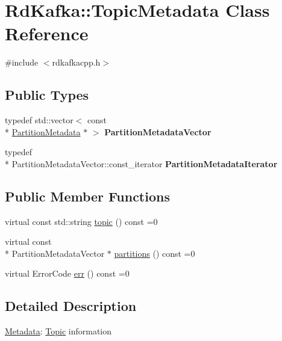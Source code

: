 \hypertarget{classRdKafka_1_1TopicMetadata}{\section{Rd\-Kafka\-:\-:Topic\-Metadata Class Reference}
\label{classRdKafka_1_1TopicMetadata}
}


{\ttfamily \#include $<$rdkafkacpp.\-h$>$}

\subsection*{Public Types}
\begin{DoxyCompactItemize}
\item 
\hypertarget{classRdKafka_1_1TopicMetadata_a79cef242d0f8c8630e7afac0ba3dfb55}{typedef std\-::vector$<$ const \\*
\hyperlink{classRdKafka_1_1PartitionMetadata}{Partition\-Metadata} $\ast$ $>$ {\bfseries Partition\-Metadata\-Vector}}\label{classRdKafka_1_1TopicMetadata_a79cef242d0f8c8630e7afac0ba3dfb55}

\item 
\hypertarget{classRdKafka_1_1TopicMetadata_aeef93f964b3c3dcde1067752be9f6508}{typedef \\*
Partition\-Metadata\-Vector\-::const\-\_\-iterator {\bfseries Partition\-Metadata\-Iterator}}\label{classRdKafka_1_1TopicMetadata_aeef93f964b3c3dcde1067752be9f6508}

\end{DoxyCompactItemize}
\subsection*{Public Member Functions}
\begin{DoxyCompactItemize}
\item 
virtual const std\-::string \hyperlink{classRdKafka_1_1TopicMetadata_ac344fa7442c91d89a7d80a39816d9d9f}{topic} () const =0
\item 
virtual const \\*
Partition\-Metadata\-Vector $\ast$ \hyperlink{classRdKafka_1_1TopicMetadata_a12ab2dc3e052e307a749c90d467c211b}{partitions} () const =0
\item 
virtual Error\-Code \hyperlink{classRdKafka_1_1TopicMetadata_a01748dcf03bb40267856600a3221c4e0}{err} () const =0
\end{DoxyCompactItemize}


\subsection{Detailed Description}
\hyperlink{classRdKafka_1_1Metadata}{Metadata}\-: \hyperlink{classRdKafka_1_1Topic}{Topic} information 

